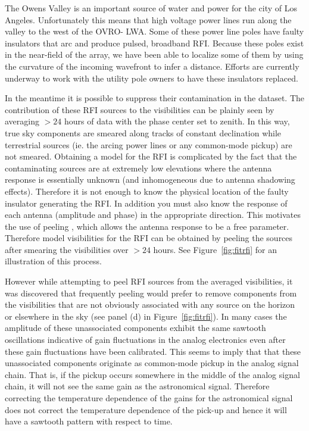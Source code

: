 \documentclass[twocolumn]{aastex61}
\begin{document}
The Owens Valley is an important source of water and power for the city of Los Angeles.
Unfortunately this means that high voltage power lines run along the valley to the west of the OVRO-
LWA. Some of these power line poles have faulty insulators that arc and produce pulsed, broadband
RFI. Because these poles exist in the near-field of the array, we have been able to localize some of
them by using the curvature of the incoming wavefront to infer a distance. Efforts are currently
underway to work with the utility pole owners to have these insulators replaced.

In the meantime it is possible to suppress their contamination in the dataset. The contribution of
these RFI sources to the visibilities can be plainly seen by averaging $>24$ hours of data with the
phase center set to zenith. In this way, true sky components are smeared along tracks of constant
declination while terrestrial sources (ie. the arcing power lines or any common-mode pickup) are not
smeared.  Obtaining a model for the RFI is complicated by the fact that the contaminating sources
are at extremely low elevations where the antenna response is essentially unknown (and inhomogeneous
due to antenna shadowing effects). Therefore it is not enough to know the physical location of the
faulty insulator generating the RFI. In addition you must also know the response of each antenna
(amplitude and phase) in the appropriate direction. This motivates the use of peeling
\citep{2008ISTSP...2..707M, 2015MNRAS.449.2668S}, which allows the antenna response to be a free
parameter.  Therefore model visibilities for the RFI can be obtained by peeling the sources after
smearing the visibilities over $>24$ hours. See Figure~\ref{fig:fitrfi} for an illustration of this
process.

However while attempting to peel RFI sources from the averaged visibilities, it was discovered that
frequently peeling would prefer to remove components from the visibilities that are not obviously
associated with any source on the horizon or elsewhere in the sky (see panel (d) in
Figure~\ref{fig:fitrfi}). In many cases the amplitude of these unassociated components exhibit the
same sawtooth oscillations indicative of gain fluctuations in the analog electronics even after
these gain fluctuations have been calibrated. This seems to imply that that these unassociated
components originate as common-mode pickup in the analog signal chain. That is, if the pickup occurs
somewhere in the middle of the analog signal chain, it will not see the same gain as the
astronomical signal. Therefore correcting the temperature dependence of the gains for the
astronomical signal does not correct the temperature dependence of the pick-up and hence it will
have a sawtooth pattern with respect to time.
\end{document}
